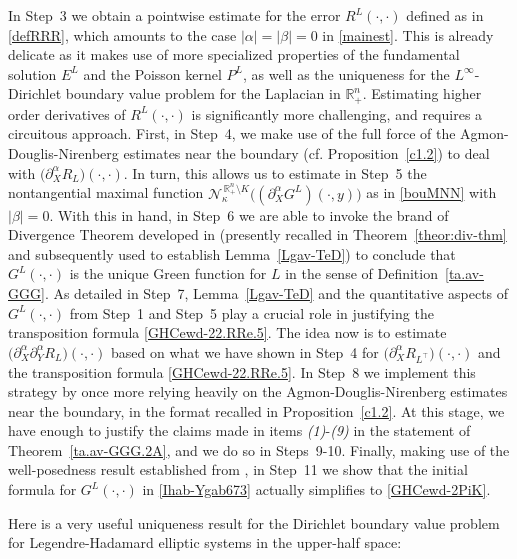 \documentclass[11pt,reqno]{amsart}
\numberwithin{equation}{section}
\theoremstyle{remark}
\begin{document}
In Step~3 we obtain a pointwise estimate for the error $R^L(\cdot,\cdot)$ defined as in \eqref{defRRR}, which amounts to the case 
$|\alpha|=|\beta|=0$ in \eqref{mainest}. This is already delicate as it makes use of more specialized properties of the fundamental solution 
$E^L$ and the Poisson kernel $P^L$, as well as the uniqueness for the $L^\infty$-Dirichlet boundary value problem for the Laplacian in 
${\mathbb{R}}^n_{+}$. Estimating higher order derivatives of $R^L(\cdot,\cdot)$ is significantly more challenging, 
and requires a circuitous approach. First, in Step~4, we make use of the full force of the Agmon-Douglis-Nirenberg estimates near the boundary 
(cf. Proposition~\ref{c1.2}) to deal with $\big(\partial^\alpha_X R_L\big)(\cdot,\cdot)$. In turn, this allows us to estimate in Step~5 the 
nontangential maximal function $\mathcal{N}^{\,{\mathbb{R}}^n_{+}\setminus K}_\kappa\big((\partial^\alpha_X G^L)(\cdot,y)\big)$ as in \eqref{bouMNN} 
with $|\beta|=0$. With this in hand, in Step~6 we are able to invoke the brand of Divergence Theorem developed in \cite{GHA.I} (presently 
recalled in Theorem~\ref{theor:div-thm} and subsequently used to establish Lemma~\ref{Lgav-TeD}) to conclude that $G^L(\cdot,\cdot)$ is the 
unique Green function for $L$ in the sense of Definition~\ref{ta.av-GGG}. As detailed in Step~7, Lemma~\ref{Lgav-TeD} and the quantitative aspects 
of $G^L(\cdot,\cdot)$ from Step~1 and Step~5 play a crucial role in justifying the transposition formula \eqref{GHCewd-22.RRe.5}. 
The idea now is to estimate $\big(\partial^\alpha_X\partial^\alpha_Y R_L\big)(\cdot,\cdot)$ based on what we have shown in 
Step~4 for $\big(\partial^\alpha_X R_{L^\top}\big)(\cdot,\cdot)$ and the transposition formula \eqref{GHCewd-22.RRe.5}.
In Step~8 we implement this strategy by once more relying heavily on the Agmon-Douglis-Nirenberg estimates near the boundary, in the format recalled 
in Proposition~\ref{c1.2}. At this stage, we have enough to justify the claims made in items {\it (1)}-{\it (9)} in the statement 
of Theorem~\ref{ta.av-GGG.2A}, and we do so in Steps~9-10. Finally, making use of the well-posedness result established from \cite[Theorem~1.21]{MMMM16},
in Step~11 we show that the initial formula for $G^L(\cdot,\cdot)$ in \eqref{Ihab-Ygab673} actually simplifies to \eqref{GHCewd-2PiK}. 

\medskip

Here is a very useful uniqueness result for the Dirichlet boundary value problem 
for Legendre-Hadamard elliptic systems in the upper-half space:
\end{document}
